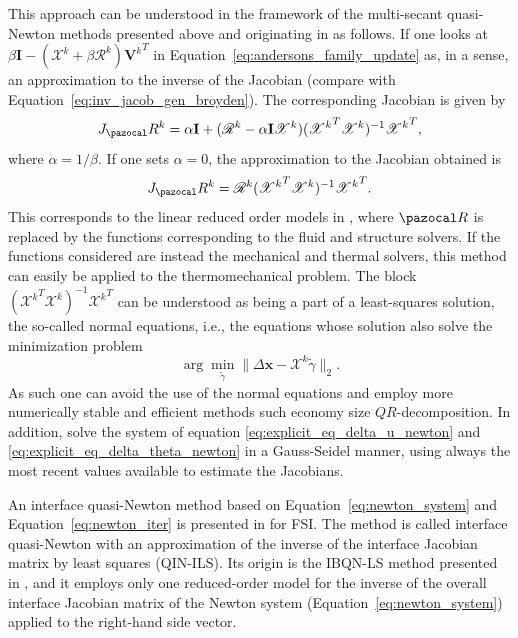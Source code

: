 This approach can be understood in the framework of the multi-secant quasi-Newton methods presented above and originating in \cite{fang_two_2009} as follows.
If one looks at \(\beta\mathbf I - (\mathscr X^k + \beta\mathscr R^k){\mathbf V^k}^T\) in Equation~\eqref{eq:andersons_family_update} as, in a sense, an approximation to the inverse of the Jacobian (compare with Equation~\eqref{eq:inv_jacob_gen_broyden}).
The corresponding Jacobian is given by
\begin{equation}
  J_\pazocal R^k = \alpha\mathbf I + (\mathscr R^k - \alpha\mathbf I\mathscr X^k )({\mathscr X^k}^T\mathscr X^k)^{-1}{\mathscr X^k}^T,
\end{equation}
where \(\alpha=1/\beta\).
If one sets \(\alpha=0\), the approximation to the Jacobian obtained is
\begin{equation}
  J_\pazocal R^k = \mathscr R^k({\mathscr X^k}^T\mathscr X^k)^{-1}{\mathscr X^k}^T.
\end{equation}
This corresponds to the linear reduced order models in \cite{vierendeels_implicit_2007}, where \(\pazocal R\) is replaced by the functions corresponding to the fluid and structure solvers.
If the functions considered are instead the mechanical and thermal solvers, this method can easily be applied to the thermomechanical problem.
The block \(({\mathscr X^k}^T\mathscr X^k)^{-1}{\mathscr X^k}^T\) can be understood as being a part of a least-squares solution, the so-called normal equations, i.e., the equations whose solution also solve the minimization problem
\begin{equation}
  \arg\min_{\tilde{\gamma}} \|\Delta \mathbf x - \mathscr{X}^k\tilde{\gamma}\|_2.
\end{equation}
As such one can avoid the use of the normal equations and employ more numerically stable and efficient methods such economy size \(QR\)-decomposition.
In addition, \cite{vierendeels_implicit_2007} solve the system of equation \eqref{eq:explicit_eq_delta_u_newton} and \eqref{eq:explicit_eq_delta_theta_newton} in a Gauss-Seidel manner, using always the most recent values available to estimate the Jacobians.

An interface quasi-Newton method based on Equation~\eqref{eq:newton_system} and Equation~\eqref{eq:newton_iter} is presented in \cite{degroote_development_2010} for FSI.
The method is called interface quasi-Newton with an approximation of the inverse of the interface Jacobian matrix by least squares (QIN-ILS).
Its origin is the IBQN-LS method presented in \cite{vierendeels_implicit_2007}, and it employs only one reduced-order model for the inverse of the overall interface Jacobian matrix of the Newton system (Equation~\eqref{eq:newton_system}) applied to the right-hand side vector.

